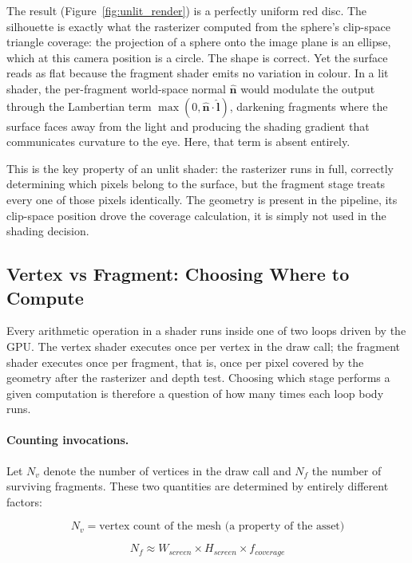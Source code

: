 \documentclass[11pt]{article}
\begin{document}
The result (Figure~\ref{fig:unlit_render}) is a perfectly uniform red disc. The silhouette is exactly what the rasterizer computed from the sphere's clip-space triangle coverage: the projection of a sphere onto the image plane is an ellipse, which at this camera position is a circle. The shape is correct. Yet the surface reads as flat because the fragment shader emits no variation in colour. In a lit shader, the per-fragment world-space normal $\hat{\mathbf{n}}$ would modulate the output through the Lambertian term $\max(0, \hat{\mathbf{n}} \cdot \hat{\mathbf{l}})$, darkening fragments where the surface faces away from the light and producing the shading gradient that communicates curvature to the eye. Here, that term is absent entirely.

This is the key property of an unlit shader: the rasterizer runs in full, correctly determining which pixels belong to the surface, but the fragment stage treats every one of those pixels identically. The geometry is present in the pipeline, its clip-space position drove the coverage calculation, it is simply not used in the shading decision.


\subsection{Vertex vs Fragment: Choosing Where to Compute}

Every arithmetic operation in a shader runs inside one of two loops driven by the GPU. The vertex shader executes once per vertex in the draw call; the fragment shader executes once per fragment, that is, once per pixel covered by the geometry after the rasterizer and depth test. Choosing which stage performs a given computation is therefore a question of how many times each loop body runs.

\paragraph{Counting invocations.}

Let $N_v$ denote the number of vertices in the draw call and $N_f$ the number of surviving fragments. These two quantities are determined by entirely different factors:

\begin{equation}
    N_v = \text{vertex count of the mesh (a property of the asset)}
\end{equation}

\begin{equation}
    N_f \approx W_{screen} \times H_{screen} \times f_{coverage}
\end{equation}
\end{document}

